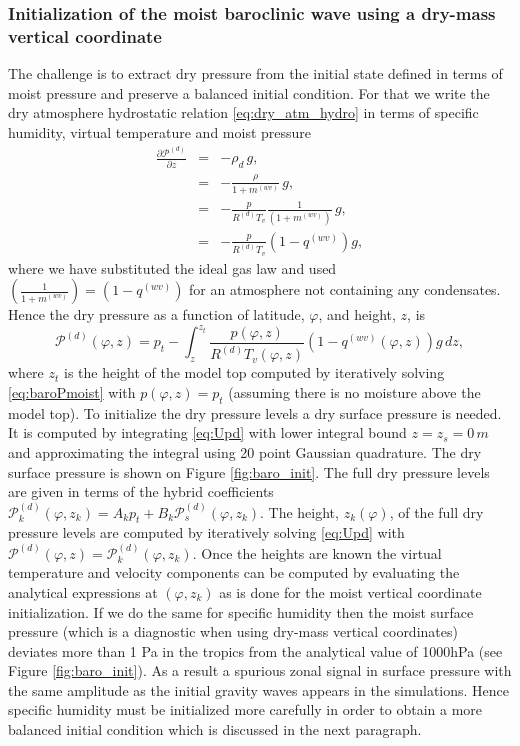 \documentclass{agujournal}
\begin{document}
{\subsubsection{Initialization of the moist baroclinic wave using a dry-mass vertical coordinate}
The challenge is to extract dry pressure from the initial state defined in terms of moist pressure and preserve a balanced initial condition. For that we write the dry atmosphere hydrostatic relation \eqref{eq:dry_atm_hydro} in terms of specific humidity, virtual temperature and moist pressure
\begin{eqnarray}
\frac{\partial \mathcal{P}^{(d)}}{\partial z}&=&-\rho_d\, g,\\
&=&-\frac{\rho}{1+m^{(wv)}}\, g,\\
&=&-\frac{p}{R^{(d)}T_v}\frac{1}{\left( 1+m^{(wv)}\right)}\, g,\\
&=&-\frac{p}{R^{(d)}T_v}\left(1-q^{(wv)}\right)g,
\end{eqnarray}
where we have substituted the ideal gas law and used $\left( \frac{1}{1+m^{(wv)}} \right)=\left( 1-q^{(wv)} \right)$ for an atmosphere not containing any condensates. Hence the dry pressure as a function of latitude, $\varphi$, and height, $z$, is
\begin{equation}
{\mathcal{P}}^{(d)}(\varphi,z)=p_t-\int_z^{z_t}\frac{p(\varphi,z)}{R^{(d)} T_v(\varphi,z)}\left(1-q^{(wv)}(\varphi,z)\right) g\, dz,\label{eq:Upd}
\end{equation}
where $z_t$ is the height of the model top computed by iteratively solving \eqref{eq:baroPmoist} with $p(\varphi,z)=p_t$ (assuming there is no moisture above the model top). To initialize the dry pressure levels a dry surface pressure is needed. It is computed by integrating \eqref{eq:Upd} with lower integral bound $z=z_s=0\, m$ and approximating the integral using 20 point Gaussian quadrature. The dry surface pressure is shown on Figure \ref{fig:baro_init}. The full dry pressure levels are given in terms of the hybrid coefficients ${\mathcal{P}_k^{(d)}}(\varphi,z_k)=A_k p_t+B_k {\mathcal{P}_s^{(d)}}(\varphi,z_k)$. The height, $z_{k}(\varphi)$, of the full dry pressure levels are computed by iteratively solving \eqref{eq:Upd} with ${\mathcal{P}}^{(d)}(\varphi,z)={\mathcal{P}}_{k}^{(d)}(\varphi,z_k)$. Once the heights are known the virtual temperature and velocity components can be computed by evaluating the analytical expressions at $(\varphi,z_k)$ as is done for the moist vertical coordinate initialization. If we do the same for specific humidity then the moist surface pressure (which is a diagnostic when using dry-mass vertical coordinates) deviates more than 1 Pa in the tropics from the analytical value of 1000hPa  (see Figure \ref{fig:baro_init}). As a result a spurious zonal signal in surface pressure with the same amplitude as the initial gravity waves appears in the simulations. Hence specific humidity must be initialized more carefully in order to obtain a more balanced initial condition which is discussed in the next paragraph. 

}
\end{document}
